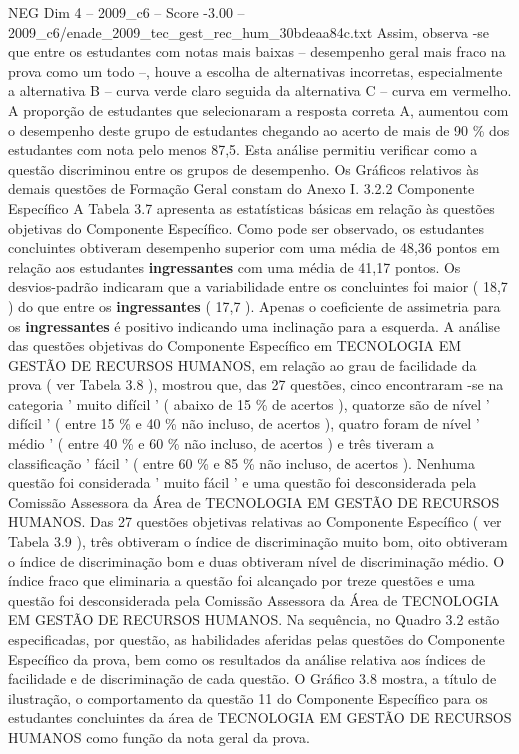 \begin{textsample}{NEG Dim 4 – 2009\_c6 – Score -3.00 – 2009\_c6/enade\_2009\_tec\_gest\_rec\_hum\_30bdeaa84c.txt}
Assim, observa -se que entre os estudantes com notas mais baixas – desempenho geral mais fraco na prova como um todo –, houve a escolha de alternativas incorretas, especialmente a alternativa B – curva verde claro seguida da alternativa C – curva em vermelho.
A proporção de estudantes que selecionaram a resposta correta A, aumentou com o desempenho deste grupo de estudantes chegando ao acerto de mais de 90 \% dos estudantes com nota pelo menos 87,5.
Esta análise permitiu verificar como a questão discriminou entre os grupos de desempenho.
Os Gráficos relativos às demais questões de Formação Geral constam do Anexo I. 3.2.2 Componente Específico A Tabela 3.7 apresenta as estatísticas básicas em relação às questões objetivas do Componente Específico.
Como pode ser observado, os estudantes concluintes obtiveram desempenho superior com uma média de 48,36 pontos em relação aos estudantes \textbf{ingressantes} com uma média de 41,17 pontos.
Os desvios-padrão indicaram que a variabilidade entre os concluintes foi maior ( 18,7 ) do que entre os \textbf{ingressantes} ( 17,7 ).
Apenas o coeficiente de assimetria para os \textbf{ingressantes} é positivo indicando uma inclinação para a esquerda.
A análise das questões objetivas do Componente Específico em TECNOLOGIA EM GESTÃO DE RECURSOS HUMANOS, em relação ao grau de facilidade da prova ( ver Tabela 3.8 ), mostrou que, das 27 questões, cinco encontraram -se na categoria ' muito difícil ' ( abaixo de 15 \% de acertos ), quatorze são de nível ' difícil ' ( entre 15 \% e 40 \% não incluso, de acertos ), quatro foram de nível ' médio ' ( entre 40 \% e 60 \% não incluso, de acertos ) e três tiveram a classificação ' fácil ' ( entre 60 \% e 85 \% não incluso, de acertos ).
Nenhuma questão foi considerada ' muito fácil ' e uma questão foi desconsiderada pela Comissão Assessora da Área de TECNOLOGIA EM GESTÃO DE RECURSOS HUMANOS.
Das 27 questões objetivas relativas ao Componente Específico ( ver Tabela 3.9 ), três obtiveram o índice de discriminação muito bom, oito obtiveram o índice de discriminação bom e duas obtiveram nível de discriminação médio.
O índice fraco que eliminaria a questão foi alcançado por treze questões e uma questão foi desconsiderada pela Comissão Assessora da Área de TECNOLOGIA EM GESTÃO DE RECURSOS HUMANOS.
Na sequência, no Quadro 3.2 estão especificadas, por questão, as habilidades aferidas pelas questões do Componente Específico da prova, bem como os resultados da análise relativa aos índices de facilidade e de discriminação de cada questão.
O Gráfico 3.8 mostra, a título de ilustração, o comportamento da questão 11 do Componente Específico para os estudantes concluintes da área de TECNOLOGIA EM GESTÃO DE RECURSOS HUMANOS como função da nota geral da prova.

\end{textsample}
